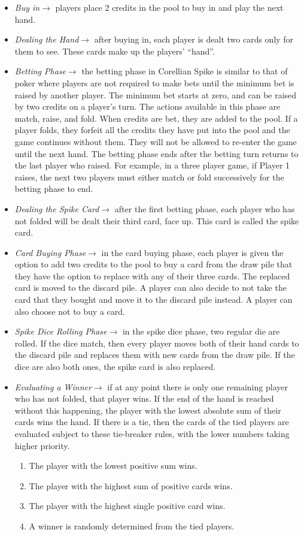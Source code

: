 \documentclass{article}
\begin{document}
\begin{itemize}
\item \textit{Buy in}$\rightarrow$ players place 2 credits in the pool to buy in and play the next hand. 
\item \textit{Dealing the Hand}$\rightarrow$ after buying in, each player is dealt two cards only for them to see. These cards make up the players' ``hand''.
\item \textit{Betting Phase}$\rightarrow$ the betting phase in Corellian Spike is similar to that of poker where players are not required to make bets until the minimum bet is raised by another player. The minimum bet starts at zero, and can be raised by two credits on a player's turn. The actions available in this phase are match, raise, and fold. When credits are bet, they are added to the pool. If a player folds, they forfeit all the credits they have put into the pool and the game continues without them. They will not be allowed to re-enter the game until the next hand. The betting phase ends after the betting turn returns to the last player who raised. For example, in a three player game, if Player 1 raises, the next two players must either match or fold successively for the betting phase to end. 
\item \textit{Dealing the Spike Card}$\rightarrow$ after the first betting phase, each player who has not folded will be dealt their third card, face up. This card is called the spike card. 
\item \textit{Card Buying Phase}$\rightarrow$ in the card buying phase, each player is given the option to add two credits to the pool to buy a card from the draw pile that they have the option to replace with any of their three cards. The replaced card is moved to the discard pile. A player can also decide to not take the card that they bought and move it to the discard pile instead. A player can also choose not to buy a card.
\item \textit{Spike Dice Rolling Phase}$\rightarrow$ in the spike dice phase, two regular die are rolled. If the dice match, then every player moves both of their hand cards to the discard pile and replaces them with new cards from the draw pile. If the dice are also both ones, the spike card is also replaced.
\item \textit{Evaluating a Winner}$\rightarrow$ if at any point there is only one remaining player who has not folded, that player wins. If the end of the hand is reached without this happening, the player with the lowest absolute sum of their cards wins the hand. If there is a tie, then the cards of the tied players are evaluated subject to these tie-breaker rules, with the lower numbers taking higher priority. 
\begin{enumerate}
    \item The player with the lowest positive sum wins. 
    \item The player with the highest sum of positive cards wins. 
    \item The player with the highest single positive card wins. 
    \item A winner is randomly determined from the tied players.
\end{enumerate}
\end{itemize}
\end{document}
